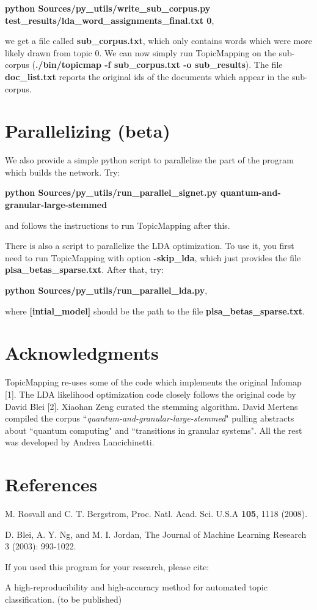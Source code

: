 \documentclass[11pt]{article}
\begin{document}
\textbf{python Sources/py\_utils/write\_sub\_corpus.py test\_results/lda\_word\_assignments\_final.txt 0},

we get a file called \textbf{sub\_corpus.txt}, which only contains words which were more likely drawn from topic 0.  We can now simply run TopicMapping on the sub-corpus (\textbf{./bin/topicmap -f sub\_corpus.txt -o sub\_results}). The file \textbf{doc\_list.txt} reports the original ids of the documents which appear in the sub-corpus.


\section{Parallelizing (beta)}

We also provide a simple python script to parallelize the part of the program which builds the network. Try:

\textbf{python Sources/py\_utils/run\_parallel\_signet.py quantum-and-granular-large-stemmed}

and follows the instructions to run TopicMapping after this.

There is also a script to parallelize the LDA optimization. To use it, you first need to run TopicMapping with option \textbf{-skip\_lda}, which just provides the file \textbf{plsa\_betas\_sparse.txt}.  After that, try:

\textbf{python Sources/py\_utils/run\_parallel\_lda.py},

where \textbf{[intial\_model]} should be the path to the file \textbf{plsa\_betas\_sparse.txt}.






\section{Acknowledgments}

TopicMapping re-uses some of the code which implements the original Infomap [1]. The LDA likelihood optimization code closely follows the 
original code by David Blei [2].
Xiaohan Zeng curated the stemming algorithm. David Mertens compiled the corpus ``\textit{quantum-and-granular-large-stemmed}" pulling abstracts about ``quantum computing" and ``transitions in granular systems". 
All the rest was developed by Andrea Lancichinetti.

%
%
%
%
%
%

\section{References}


\vskip0.3cm

\noindent [1] M. Rosvall and  C. T. Bergstrom, Proc. Natl. Acad. Sci. U.S.A {\bf 105}, 1118 (2008).

\vskip0.3cm
\noindent [2] D. Blei, A. Y. Ng, and M. I. Jordan,  The Journal of Machine Learning Research 3 (2003): 993-1022.



\vskip0.3cm
\vskip0.3cm
If you used this program for your research, please cite:

\noindent [3] A high-reproducibility and high-accuracy method for automated topic classification. (to be published)

\vskip0.3cm
\end{document}
